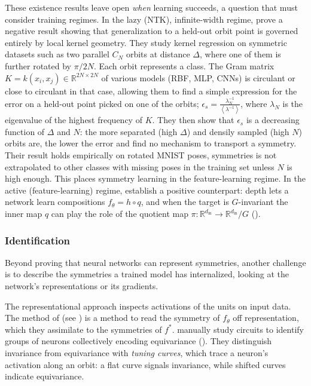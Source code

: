 \documentclass[mathematics,review,submit,moreauthors]{Definitions/mdpi}
\begin{document}
These existence results leave open \emph{when} learning succeeds, a question that must consider training regimes.
In the lazy (NTK), infinite-width regime, \citet{perin2025} prove a negative result showing that generalization to a held-out orbit point is governed entirely by local kernel geometry.
They study kernel regression on symmetric datasets such as two parallel $C_N$ orbits at distance $\Delta$, where one of them is further rotated by $\pi/2N$. Each orbit represents a class.
The Gram matrix $K=k(x_i, x_j) \in \mathbb R^{2N\times 2N}$ of various models (RBF, MLP, CNNs) is circulant or close to circulant in that case, allowing them to find a simple expression for the error on a held-out point picked on one of the orbits; $\epsilon_s=\frac{\lambda_N^{-1}}{\left\langle \lambda^{-1}\right\rangle}$, where $\lambda_N$ is the eigenvalue of the highest frequency of $K$.
They then show that $\epsilon_s$ is a decreasing function of $\Delta$ and $N$: the more separated (high $\Delta$) and densily sampled (high $N$) orbits are, the lower the error and find no mechanism to transport a symmetry.
Their result holds empirically on rotated MNIST poses, symmetries is not extrapolated to other classes with missing poses in the training set unless $N$ is high enough.
This places symmetry learning in the feature-learning regime.
In the active (feature-learning) regime, \citet{jacot2025} establish a positive counterpart: depth lets a network learn compositions $f_\theta = h \circ q$, and when the target is $G$-invariant the inner map $q$ can play the role of the quotient map $\pi:\mathbb{R}^{d_{\mathrm{in}}} \to \mathbb{R}^{d_{\mathrm{in}}}/G$ ().

\subsubsection{Identification}\label{sec:disco-identification}
Beyond proving that neural networks can represent symmetries, another challenge is to describe the symmetries a trained model has internalized, looking at the network's representations or its gradients.

The representational approach inspects activations of the units on input data.
The method of \citet{krippendorf2020} (see ) is a method to read the symmetry of $f_\theta$ off representation, which they assimilate to the symmetries of $f^*$. 
\citet{olah2020d} manually study circuits to identify groups of neurons collectively encoding equivariance ().
They distinguish invariance from equivariance with \emph{tuning curves}, which trace a neuron's activation along an orbit: a flat curve signals invariance, while shifted curves indicate equivariance.
\end{document}
